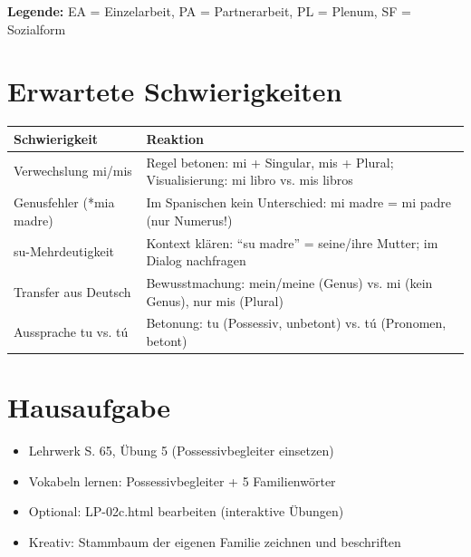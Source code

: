 \documentclass[11pt,a4paper]{article}
\begin{document}
\textbf{Legende:} EA = Einzelarbeit, PA = Partnerarbeit, PL = Plenum, SF = Sozialform

\section{Erwartete Schwierigkeiten}

\begin{tabular}{|p{5cm}|p{8cm}|}
\hline
\textbf{Schwierigkeit} & \textbf{Reaktion} \\
\hline
Verwechslung mi/mis & Regel betonen: mi + Singular, mis + Plural; Visualisierung: mi libro vs. mis libros \\
\hline
Genusfehler (*mia madre) & Im Spanischen kein Unterschied: mi madre = mi padre (nur Numerus!) \\
\hline
su-Mehrdeutigkeit & Kontext klären: ``su madre'' = seine/ihre Mutter; im Dialog nachfragen \\
\hline
Transfer aus Deutsch & Bewusstmachung: mein/meine (Genus) vs. mi (kein Genus), nur mis (Plural) \\
\hline
Aussprache tu vs. tú & Betonung: tu (Possessiv, unbetont) vs. tú (Pronomen, betont) \\
\hline
\end{tabular}

\section{Hausaufgabe}

\begin{itemize}
    \item Lehrwerk S. 65, Übung 5 (Possessivbegleiter einsetzen)
    \item Vokabeln lernen: Possessivbegleiter + 5 Familienwörter
    \item Optional: LP-02c.html bearbeiten (interaktive Übungen)
    \item Kreativ: Stammbaum der eigenen Familie zeichnen und beschriften
\end{itemize}

\end{document}
